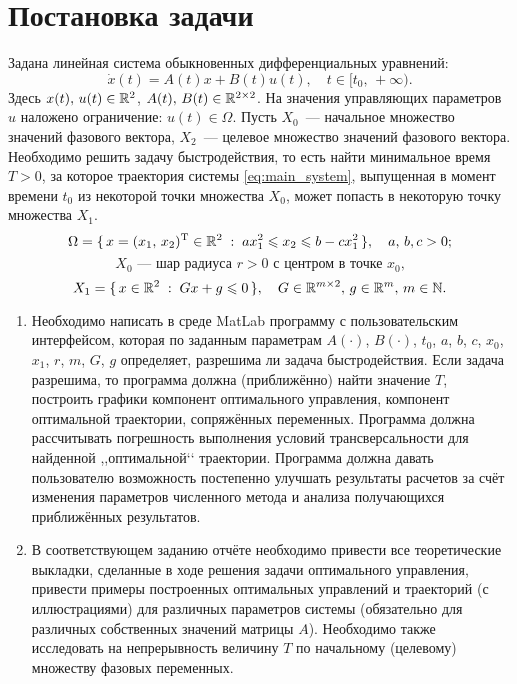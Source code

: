 \section{Постановка задачи}

Задана линейная система обыкновенных дифференциальных уравнений:
\begin{equation}\label{eq:main_system}
        \dot x(t) = A(t)x + B(t)u(t), \quad t \in [t_0,\,+\infty).
\end{equation}
Здесь $x(t),\,u(t) \in \mathbb{R}^2$, $A(t),\,B(t) \in \mathbb{R}^{2 \times 2}$.
На значения управляющих параметров $u$ наложено ограничение: $u(t) \in \Omega$.
Пусть $X_0$~--- начальное множество значений фазового вектора, $X_2$~--- целевое множество значений фазового вектора.
Необходимо решить задачу быстродействия, то есть найти минимальное время $T > 0$, за которое траектория системы \eqref{eq:main_system}, выпущенная в момент времени $t_0$ из некоторой точки множества $X_0$, может попасть в некоторую точку множества $X_1$.
$$
        \Omega = \{\,x = (x_1,\,x_2)^{\mathrm{T}} \in \mathbb{R}^2 \;:\; ax_1^2 \leqslant x_2 \leqslant b - cx_1^2\,\},\quad a,\,b,c > 0;
$$ 
$$
        \mbox{$X_0$~--- шар радиуса $r > 0$ с центром в точке $x_0$,}
$$
$$
        X_1 = \{\,x \in \mathbb{R}^2 \;:\; Gx + g \leqslant 0 \,\},
        \quad G \in \mathbb{R}^{m \times 2},\,
        g \in \mathbb{R}^m,\,
        m \in \mathbb{N}.
$$
\begin{enumerate}
        \item Необходимо написать в среде MatLab программу с пользовательским интерфейсом, которая по заданным параметрам $A(\cdot)$, $B(\cdot)$, $t_0$, $a$, $b$, $c$, $x_0$, $x_1$, $r$, $m$, $G$, $g$ определяет, разрешима ли задача быстродействия.
        Если задача разрешима, то программа должна (приближённо) найти значение $T$, построить графики компонент оптимального управления, компонент оптимальной траектории, сопряжённых переменных.
        Программа должна рассчитывать погрешность выполнения условий трансверсальности для найденной ,,оптимальной‘‘ траектории.
        Программа должна давать пользователю возможность постепенно улучшать результаты расчетов за счёт изменения параметров численного метода и анализа получающихся приближённых результатов.

        \item В соответствующем заданию отчёте необходимо привести все теоретические выкладки, сделанные в ходе решения задачи оптимального управления, привести примеры построенных оптимальных управлений и траекторий (с иллюстрациями) для различных параметров системы (обязательно для различных собственных значений матрицы $A$).
        Необходимо также исследовать на непрерывность величину $T$ по начальному (целевому) множеству фазовых переменных.
\end{enumerate}